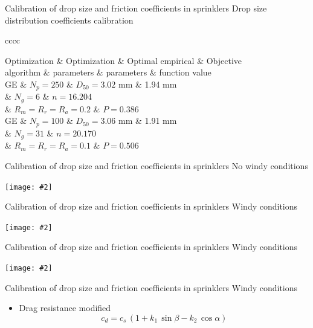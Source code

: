 \documentclass[10pt]{beamer}
\newcommand{\PA}[1]{\left(#1\right)}
\newcommand{\FIGURE}[2]
{
	\begin{center}
		\texttt{[image: \#2]}
	\end{center}
}
\newcommand{\TABLE}[3]
{
	\begin{table}[ht!]
		\centering
		#1
		\tabulinesep=0.9mm
		\begin{tabu}{#2}
			#3
		\end{tabu}
	\end{table}
}
\begin{document}
\begin{frame}{Calibration of drop size and friction coefficients in sprinklers}
{Drop size distribution coefficients calibration}
\TABLE{\tiny}{cccc}
{
	Optimization & Optimization & Optimal empirical & Objective
	\\ algorithm & parameters & parameters & function value
	\\ \hline
	GE & $N_p=250$ & $D_{50}=3.02$ mm & 1.94 mm
	\\ & $N_g=6$ & $n=16.204$
	\\ & $R_m=R_r=R_a=0.2$ & $P=0.386$
	\\ \hline
	GE & $N_p=100$ & $D_{50}=3.06$ mm & 1.91 mm
	\\ & $N_g=31$ & $n=20.170$
	\\ & $R_m=R_r=R_a=0.1$ & $P=0.506$
	\\ \hline
}
\end{frame}

\begin{frame}{Calibration of drop size and friction coefficients in sprinklers}
{No windy conditions}
\FIGURE{width=\textwidth}{sprinkler-0.eps}
\end{frame}

\begin{frame}{Calibration of drop size and friction coefficients in sprinklers}
{Windy conditions}
\FIGURE{width=\textwidth}{viento-favor.ps}
\end{frame}

\begin{frame}{Calibration of drop size and friction coefficients in sprinklers}
{Windy conditions}
\FIGURE{width=\textwidth}{viento-perpendicular.ps}
\end{frame}

\begin{frame}{Calibration of drop size and friction coefficients in sprinklers}
{Windy conditions}
	\begin{itemize}
		\item Drag resistance modified
			\[c_d=c_s\,\PA{1+k_1\,\sin\beta-k_2\,\cos\alpha}\]
	\end{itemize}
\end{frame}
\end{document}
